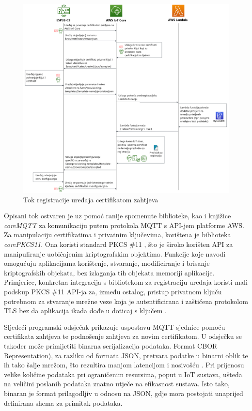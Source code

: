 \begin{figure}[ht]
	\centering
	\includegraphics[scale=0.2]{imgs/fleet_provisioning_by_claim}
	\caption{Tok registracije uređaja certifikatom zahtjeva \cite{aws_docs}}
	\label{fig:fleet_provisioning_by_claim}
\end{figure}

Opisani tok ostvaren je uz pomoć ranije spomenute biblioteke, kao i knjižice \textit{coreMQTT} za komunikaciju putem protokola MQTT s API-jem platforme AWS. Za manipulaciju certifikatima i privatnim ključevima, korištena je biblioteka \textit{corePKCS11}. Ona koristi standard PKCS \#11 , što je široko korišten API za manipuliranje uobičajenim kriptografskim objektima. Funkcije koje navodi omogućuju aplikacijama korištenje, stvaranje, modificiranje i brisanje kriptografskih objekata, bez izlaganja tih objekata memoriji aplikacije. Primjerice, konkretna integracija s bibliotekom za registraciju uređaja koristi mali podskup PKCS \#11 API-ja za, između ostalog, pristup privatnom ključu potrebnom za stvaranje mrežne veze koja je autentificirana i zaštićena protokolom TLS bez da aplikacija ikada dođe u doticaj s ključem \cite{what_is_pkcs}. 

Sljedeći programski odsječak prikazuje uspostavu MQTT sjednice pomoću certifikata zahtjeva te podnošenje zahtjeva za novim certifikatom. U odsječku se također može primijetiti binarna serijalizacija podataka. Format CBOR  Representation), za razliku od formata JSON, pretvara podatke u binarni oblik te ih tako šalje mrežom, što rezultira manjom latencijom i nosivošću  \cite{cbor}. Pri prijenosu velike količine podataka pri ograničenim resursima, poput u IoT sustava, ušteda na veličini poslanih podataka znatno utječe na efikasnost sustava. Isto tako, binaran je format prilagodljiv u odnosu na JSON, gdje mora postojati unaprijed definirana shema za primitak podataka.


